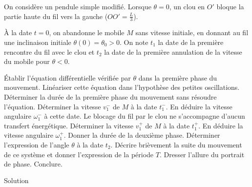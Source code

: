 \begin{Exercise}[title=Pendule avec un obstacle]
  On considère un pendule simple modifié. Lorsque $\theta=0$, un clou en $O'$ bloque la partie haute du fil vers la gauche ($OO'=\frac{L}{3}$).

  À la date $t=0$, on abandonne le mobile $M$ sans vitesse initiale, en donnant au fil une inclinaison initiale $\theta(0)=\theta_0>0$. On note $t_1$ la date de la première rencontre du fil avec le clou et $t_2$ la date de la première annulation de la vitesse du mobile pour $\theta <0$.

  Établir l'équation différentielle vérifiée par $\theta$ dans la première phase du mouvement.
    \Question Linéariser cette équation dans l'hypothèse des petites oscillations. Déterminer la durée de la première phase du mouvement sans résoudre l'équation.
    \Question Déterminer la vitesse $v_1^-$ de $M$ à la date $t_1^-$. En déduire la vitesse angulaire $\omega_1^-$ à cette date.
    \Question Le blocage du fil par le clou ne s'accompagne d'aucun transfert énergétique. Déterminer la vitesse $v_1^+$ de $M$ à la date $t_1^+$. En déduire la vitesse angulaire $\omega_1^+$.
    \Question Donner la durée de la deuxième phase.
    \Question Déterminer l'expression de l'angle $\theta$ à la date $t_2$.
    \Question Décrire brièvement la suite du mouvement de ce système et donner l'expression de la période $T$.
    \Question Dresser l'allure du portrait de phase. Conclure.

    \begin{center}
    \end{center}
  \end{Exercise}
\begin{Answer}
  Solution
\end{Answer}
